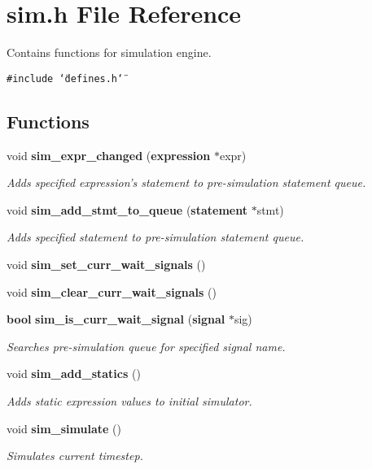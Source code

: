 \section{sim.h File Reference}
\label{sim_8h}
Contains functions for simulation engine.  


{\tt \#include \char`\"{}defines.h\char`\"{}}\par
\subsection*{Functions}
\begin{CompactItemize}
\item 
void {\bf sim\_\-expr\_\-changed} ({\bf expression} $\ast$expr)
\begin{CompactList}\small\item\em Adds specified expression's statement to pre-simulation statement queue. \item\end{CompactList}\item 
void {\bf sim\_\-add\_\-stmt\_\-to\_\-queue} ({\bf statement} $\ast$stmt)
\begin{CompactList}\small\item\em Adds specified statement to pre-simulation statement queue. \item\end{CompactList}\item 
void {\bf sim\_\-set\_\-curr\_\-wait\_\-signals} ()
\item 
void {\bf sim\_\-clear\_\-curr\_\-wait\_\-signals} ()
\item 
{\bf bool} {\bf sim\_\-is\_\-curr\_\-wait\_\-signal} ({\bf signal} $\ast$sig)
\begin{CompactList}\small\item\em Searches pre-simulation queue for specified signal name. \item\end{CompactList}\item 
void {\bf sim\_\-add\_\-statics} ()
\begin{CompactList}\small\item\em Adds static expression values to initial simulator. \item\end{CompactList}\item 
void {\bf sim\_\-simulate} ()
\begin{CompactList}\small\item\em Simulates current timestep. \item\end{CompactList}\end{CompactItemize}


